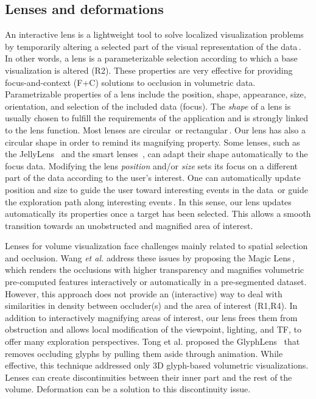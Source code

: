 \vspace{-0.15cm}
\subsection{Lenses and deformations}
%
An interactive lens is a lightweight tool to solve localized visualization problems by temporarily altering a selected part of the visual representation of the data\,\cite{CGF:CGF12871}. In other words, a lens is a parameterizable selection according to which a base visualization is altered (R2). These properties are very effective for providing focus-and-context (F+C) solutions to occlusion in volumetric data. Parametrizable properties of a lens include the position, shape, appearance, size, orientation, and selection of the included data (focus). The \emph{shape} of a lens is usually chosen to fulfill the requirements of the application and is strongly linked to the lens function. Most lenses are circular\,\cite{1648236} or rectangular\,\cite{Kincaid:2010:SFA:1907651.1907963}. Our lens has also a circular shape in order to remind its magnifying property. Some lenses, such as the JellyLens~\cite{Pindat:2012:JCA:2380116.2380150} and the smart lenses~\cite{Thiede2008}, can adapt their shape automatically to the focus data. Modifying the lens \emph{position} and/or \emph{size} sets its focus on a different part of the data according to the user's interest. One can automatically update position and size to guide the user toward interesting events in the data\,\cite{Tominski:2011:ECU:2336207.2336211} or guide the exploration path along interesting events\,\cite{Alvina:2014:RER:2598153.2598200}. In this sense, our lens updates automatically its properties once a target has been selected. This allows a smooth transition towards an unobstructed and magnified area of interest.

Lenses for volume visualization face challenges mainly related to spatial selection and occlusion. Wang \emph{et al.} address these issues by proposing the Magic Lens\,\cite{1532818}, which renders the occlusions with higher transparency and magnifies volumetric pre-computed features interactively or automatically in a pre-segmented dataset. However, this approach does not provide an (interactive) way to deal with similarities in density between occluder(s) and the area of interest (R1,R4). In addition to interactively magnifying areas of interest, our lens frees them from obstruction and allows local modification of the viewpoint, lighting, and TF, to offer many exploration perspectives. Tong et al. proposed the GlyphLens~\cite{7539643} that removes occluding glyphs by pulling them aside through animation. While effective, this technique addressed only 3D glyph-based volumetric visualizations. Lenses can create discontinuities between their inner part and the rest of the volume. Deformation can be a solution to this discontinuity issue.

